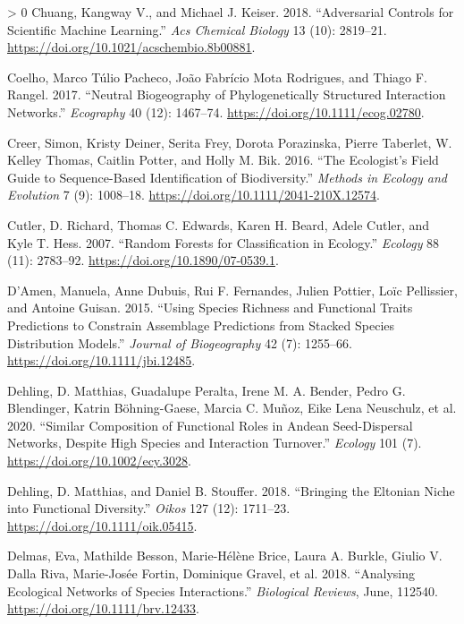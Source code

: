 \documentclass[11pt]{article}
\newlength{\cslhangindent}
\newenvironment{CSLReferences}[3] %
 {%
  \setlength{\parindent}{0pt}
  \ifodd #1 \everypar{\setlength{\hangindent}{\cslhangindent}}\ignorespaces\fi
  \ifnum #2 > 0
  \setlength{\parskip}{#2\baselineskip}
  \fi
 }%
 {}
\begin{document}
\begin{CSLReferences}{1}{0}
\leavevmode\hypertarget{ref-Chuang2018AdvCon}{}%
Chuang, Kangway V., and Michael J. Keiser. 2018. {``Adversarial Controls
for Scientific Machine Learning.''} \emph{Acs Chemical Biology} 13 (10):
2819--21. \url{https://doi.org/10.1021/acschembio.8b00881}.

\leavevmode\hypertarget{ref-Coelho2017NeuBio}{}%
Coelho, Marco Túlio Pacheco, João Fabrício Mota Rodrigues, and Thiago F.
Rangel. 2017. {``Neutral Biogeography of Phylogenetically Structured
Interaction Networks.''} \emph{Ecography} 40 (12): 1467--74.
\url{https://doi.org/10.1111/ecog.02780}.

\leavevmode\hypertarget{ref-Creer2016EcoSF}{}%
Creer, Simon, Kristy Deiner, Serita Frey, Dorota Porazinska, Pierre
Taberlet, W. Kelley Thomas, Caitlin Potter, and Holly M. Bik. 2016.
{``The Ecologist's Field Guide to Sequence-Based Identification of
Biodiversity.''} \emph{Methods in Ecology and Evolution} 7 (9):
1008--18. \url{https://doi.org/10.1111/2041-210X.12574}.

\leavevmode\hypertarget{ref-Cutler2007RanFor}{}%
Cutler, D. Richard, Thomas C. Edwards, Karen H. Beard, Adele Cutler, and
Kyle T. Hess. 2007. {``Random Forests for Classification in Ecology.''}
\emph{Ecology} 88 (11): 2783--92.
\url{https://doi.org/10.1890/07-0539.1}.

\leavevmode\hypertarget{ref-DAmen2015UsiSpe}{}%
D'Amen, Manuela, Anne Dubuis, Rui F. Fernandes, Julien Pottier, Loïc
Pellissier, and Antoine Guisan. 2015. {``Using Species Richness and
Functional Traits Predictions to Constrain Assemblage Predictions from
Stacked Species Distribution Models.''} \emph{Journal of Biogeography}
42 (7): 1255--66. \url{https://doi.org/10.1111/jbi.12485}.

\leavevmode\hypertarget{ref-Dehling2020SimCom}{}%
Dehling, D. Matthias, Guadalupe Peralta, Irene M. A. Bender, Pedro G.
Blendinger, Katrin Böhning-Gaese, Marcia C. Muñoz, Eike Lena Neuschulz,
et al. 2020. {``Similar Composition of Functional Roles in Andean
Seed-Dispersal Networks, Despite High Species and Interaction
Turnover.''} \emph{Ecology} 101 (7).
\url{https://doi.org/10.1002/ecy.3028}.

\leavevmode\hypertarget{ref-Dehling2018BriElt}{}%
Dehling, D. Matthias, and Daniel B. Stouffer. 2018. {``Bringing the
Eltonian Niche into Functional Diversity.''} \emph{Oikos} 127 (12):
1711--23. \url{https://doi.org/10.1111/oik.05415}.

\leavevmode\hypertarget{ref-Delmas2018AnaEco}{}%
Delmas, Eva, Mathilde Besson, Marie-Hélène Brice, Laura A. Burkle,
Giulio V. Dalla Riva, Marie-Josée Fortin, Dominique Gravel, et al. 2018.
{``Analysing Ecological Networks of Species Interactions.''}
\emph{Biological Reviews}, June, 112540.
\url{https://doi.org/10.1111/brv.12433}.


\end{CSLReferences}
\end{document}
